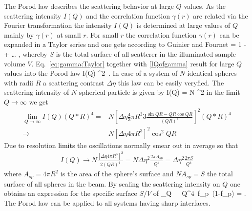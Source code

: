 The Porod law describes the scattering behavior at large $Q$ values.
As the scattering intensity $I(Q)$ and the correlation function $\gamma(r)$
are related via the Fourier transformation the intensity $I(Q)$ is determined
at large values of $Q$ mainly by $\gamma(r)$ at small $r$. For small $r$  the
correlation function $\gamma(r)$ can be expanded in a Taylor series and one
gets according to Guinier and Fournet \cite{book:Guinier:Fournet}
\BE
{} = 1 -  \,  + \dots
\quad ,
\label{eq:gamma:Taylor}
\EE
whereby $S$ is the total surface of all scatterer in the illuminated sample volume $V$.
Eq.\ \ref{eq:gamma:Taylor} together with \ref{IQofgamma} result for large
$Q$ values into the Porod law
\BE
I(Q) \longrightarrow \Delta\eta^2\,  .
\label{eq:Porodlaw}
\EE
In case of a system of $N$ identical spheres with radii $R$ a scattering contrast $\Delta \eta$ this law can be easily veryfied. The scattering intensity of $N$ spherical particle is given by
\BE
I(Q) = N ^2
\EE
in the limit $Q \rightarrow \infty$ we get
\begin{align}\label{eq:speherePorodLaw}
  \lim_{Q \rightarrow \infty} I(Q) (Q*R)^4 = & N \left[ \Delta\eta  \frac{4}{3}\pi R^3 3 \frac{\sin QR - QR \cos QR}{(QR)^3}\right]^2 (Q*R)^4\\
    \rightarrow & N \left[\Delta\eta 4 \pi R^3 \right]^2 \cos^2 QR
\end{align}
Due to resolution limits the oscillations normally smear out in average so that
\begin{align}\label{eq:speherePorodLaw}
I(Q) \rightarrow N\frac{\left[\Delta\eta 4\pi R^3 \right]^2 }{2 (QR)^4} = N \Delta\eta^2\frac{2\pi A_{sp}}{Q^4} =  \Delta\eta^2\frac{2\pi S}{Q^4}
\end{align}
where $A_{sp}=4\pi R^2$ is the area of the sphere's surface and $N A_{sp}=S$ the total surface of all spheres in the beam.
By scaling the scattering intensity on $\tilde Q$ one obtains an expression
for the specific surface $S/V$ of
\BE
\lim_{Q\rightarrow \infty} \, \pi\,\, Q^4\, f_p\,
(1-f_p) =  .
\label{eq:spez:surface}
\EE
The Porod law can be applied to all systems having sharp interfaces.
